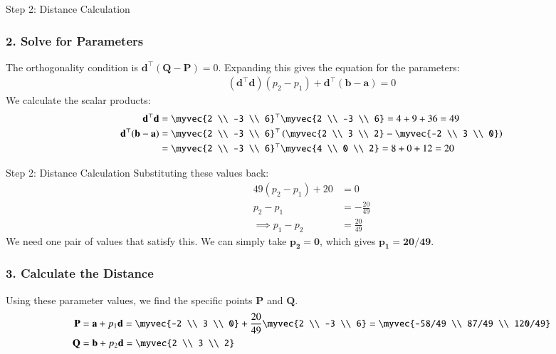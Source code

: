 \documentclass{beamer}
\newcommand{\mat}[1]{\mathbf{#1}}
\begin{document}
\begin{frame}{Step 2: Distance Calculation}
\subsubsection*{2. Solve for Parameters}
The orthogonality condition is $\mat{d}^\top(\mat{Q}-\mat{P}) = 0$. Expanding this gives the equation for the parameters:
\begin{align}
(\mat{d}^\top\mat{d})(p_2-p_1) + \mat{d}^\top(\mat{b}-\mat{a}) = 0
\end{align}
We calculate the scalar products:
\begin{align}
\mat{d}^\top\mat{d} &= \myvec{2 \\ -3 \\ 6}^\top \myvec{2 \\ -3 \\ 6} = 4 + 9 + 36 = 49 \\
\mat{d}^\top(\mat{b}-\mat{a}) &= \myvec{2 \\ -3 \\ 6}^\top \left( \myvec{2 \\ 3 \\ 2} - \myvec{-2 \\ 3 \\ 0} \right) \nonumber \\
&= \myvec{2 \\ -3 \\ 6}^\top \myvec{4 \\ 0 \\ 2} = 8 + 0 + 12 = 20
\end{align}
\end{frame}

\begin{frame}{Step 2: Distance Calculation}
Substituting these values back:
\begin{align}
49(p_2 - p_1) + 20 &= 0 \\
p_2 - p_1 &= -\frac{20}{49} \\
\implies p_1 - p_2 &= \frac{20}{49}
\end{align}
We need one pair of values that satisfy this. We can simply take $\mathbf{p_2 = 0}$, which gives $\mathbf{p_1 = 20/49}$.

\subsubsection*{3. Calculate the Distance}
Using these parameter values, we find the specific points $\mat{P}$ and $\mat{Q}$.
\begin{align}
\mat{P} &= \mat{a} + p_1\mat{d} = \myvec{-2 \\ 3 \\ 0} + \frac{20}{49}\myvec{2 \\ -3 \\ 6} = \myvec{-58/49 \\ 87/49 \\ 120/49} \\
\mat{Q} &= \mat{b} + p_2\mat{d} = \myvec{2 \\ 3 \\ 2}
\end{align}
\end{frame}
\end{document}
